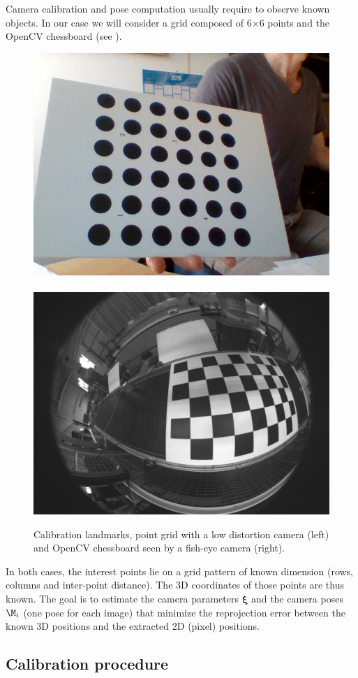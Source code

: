 \documentclass{ecnreport}
\begin{document}
Camera calibration and pose computation usually require to observe known objects. In our case we will consider a grid composed of 6$\times$6 points and
the OpenCV chessboard (see ).

\begin{figure}[h!]
 \includegraphics[width=.45\linewidth]{grid} ~~\includegraphics[width=.45\linewidth]{chessboard}
 \caption{Calibration landmarks, point grid with a low distortion camera (left) and OpenCV chessboard seen by a fish-eye camera (right).}
 \label{fig:landmarks}
\end{figure}

\newcommand{\xii}{{\boldsymbol{\xi}}}

In both cases, the interest points lie on a grid pattern of known dimension (rows, columns and inter-point distance). The 3D coordinates of those points
are thus known. The goal is to estimate the camera parameters $\xii$ and the camera poses $\M_i$ (one pose for each image) that minimize the reprojection error between the known 3D positions
and the extracted 2D (pixel) positions.

\subsection{Calibration procedure}
\label{sec:calib}
\end{document}
